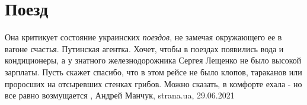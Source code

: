  
 
 
 
 
\chapter{Поезд}

Она критикует состояние украинских \emph{поездов}, не замечая окружающего ее в вагоне
счастья. Путинская агентка. Хочет, чтобы в поездах появились вода и
кондиционеры, а у знатного железнодорожника Сергея Лещенко не было высокой
зарплаты. Пусть скажет спасибо, что в этом рейсе не было клопов, тараканов или
проросших на отсыревших стенках грибов. Можно сказать, в комфорте ехала - но
все равно возмущается
, 
Андрей Манчук, strana.ua, 29.06.2021

